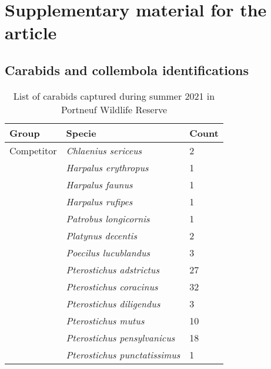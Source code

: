 \chapter{Supplementary material for the article}     %
\label{chap:supp}                   %

\pagebreak
\section{Carabids and collembola identifications}

\begin{table}[ht]
    \centering
    \caption[List of carabid species captured during summer 2021 in Portneuf Wildlife Reserve and classification between salamanders competitor and prey groups.]
    {List of carabids captured during summer 2021 in Portneuf Wildlife Reserve}
    \label{tab:carabid}
    \begin{tabular}{lll} 
        \hline
        Group & Specie & Count \\ [0.5ex] 
        \hline      
        Competitor          & \textit{Chlaenius sericeus}               & 2 \\  
                            & \textit{Harpalus erythropus}              & 1 \\
                            & \textit{Harpalus faunus}                  & 1 \\
                            & \textit{Harpalus rufipes}                 & 1 \\
                            & \textit{Patrobus longicornis}             & 1 \\
                            & \textit{Platynus decentis}                & 2 \\
                            & \textit{Poecilus lucublandus}             & 3 \\
                            & \textit{Pterostichus adstrictus}          & 27 \\
                            & \textit{Pterostichus coracinus}           & 32 \\
                            & \textit{Pterostichus diligendus}          & 3 \\
                            & \textit{Pterostichus mutus}               & 10 \\
                            & \textit{Pterostichus pensylvanicus}       & 18 \\
                            & \textit{Pterostichus punctatissimus}      & 1 \\

\end{tabular}
\end{table}

